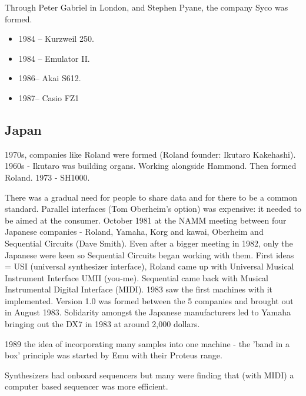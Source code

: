 Through Peter Gabriel in London, and Stephen Pyane, the company Syco was formed.

\begin{itemize}
\item 1984 – Kurzweil 250.
\item 1984 – Emulator II.
\item 1986– Akai S612. 
\item 1987– Casio FZ1
\end{itemize}

\subsection{Japan}
1970s, companies like Roland were formed (Roland founder: Ikutaro Kakehashi). 1960s - Ikutaro was building organs.  Working alongside Hammond. Then formed Roland. 1973 - SH1000. 

There was a gradual need for people to share data and for there to be a common standard. Parallel interfaces (Tom Oberheim's option) was expensive: it needed to be aimed at the consumer.  October 1981 at the NAMM meeting between four Japanese companies - Roland, Yamaha, Korg and kawai, Oberheim and Sequential Circuits (Dave Smith).  Even after a bigger meeting in 1982, only the Japanese were keen so Sequential Circuits began working with them.  First ideas = USI (universal synthesizer interface), Roland came up with Universal Musical Instrument Interface UMII (you-me).  Sequential came back with Musical Instrumental Digital Interface (MIDI). 1983 saw the first machines with it implemented. Version 1.0 was formed between the 5 companies and brought out in August 1983.   Solidarity amongst the Japanese manufacturers led to Yamaha bringing out the DX7 in 1983 at around 2,000 dollars.

1989 the idea of incorporating many samples into one machine - the 'band in a box' principle was started by Emu with their Proteus range.

Synthesizers had onboard sequencers but many were finding that (with MIDI) a computer based sequencer was more efficient.  

